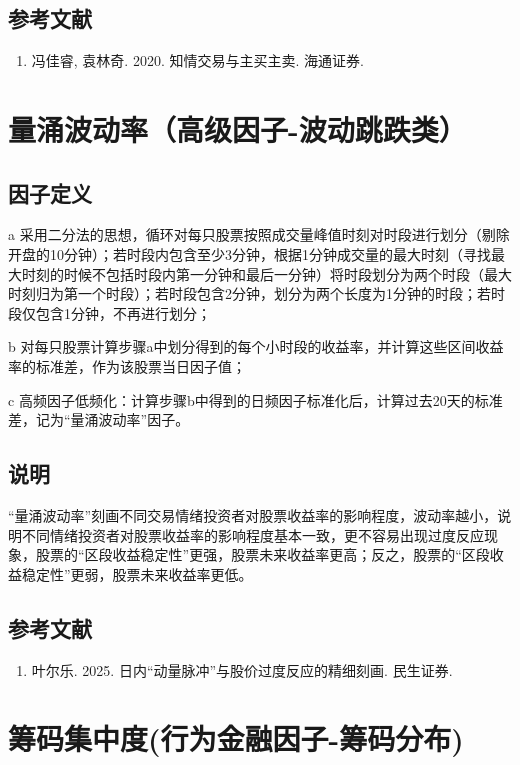 \documentclass{article}
\begin{document}
\subsection{参考文献}
\begin{enumerate}
    \item 冯佳睿, 袁林奇. 2020. 知情交易与主买主卖. 海通证券.
\end{enumerate}

\section{量涌波动率（高级因子-波动跳跌类）}

\subsection{因子定义}

a 采用二分法的思想，循环对每只股票按照成交量峰值时刻对时段进行划分（剔除开盘的10分钟）；若时段内包含至少3分钟，根据1分钟成交量的最大时刻（寻找最大时刻的时候不包括时段内第一分钟和最后一分钟）将时段划分为两个时段（最大时刻归为第一个时段）；若时段包含2分钟，划分为两个长度为1分钟的时段；若时段仅包含1分钟，不再进行划分；

b 对每只股票计算步骤a中划分得到的每个小时段的收益率，并计算这些区间收益率的标准差，作为该股票当日因子值；

c 高频因子低频化：计算步骤b中得到的日频因子标准化后，计算过去20天的标准差，记为“量涌波动率”因子。

\subsection{说明}
“量涌波动率”刻画不同交易情绪投资者对股票收益率的影响程度，波动率越小，说明不同情绪投资者对股票收益率的影响程度基本一致，更不容易出现过度反应现象，股票的“区段收益稳定性”更强，股票未来收益率更高；反之，股票的“区段收益稳定性”更弱，股票未来收益率更低。

\subsection{参考文献}
\begin{enumerate}
    \item 叶尔乐. 2025. 日内“动量脉冲”与股价过度反应的精细刻画. 民生证券.
\end{enumerate}

\section{筹码集中度(行为金融因子-筹码分布)}
\end{document}
